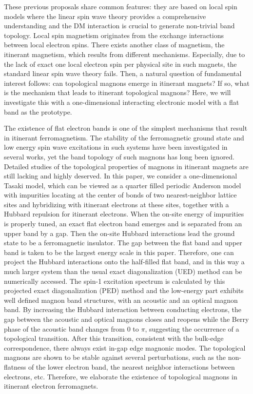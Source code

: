 \documentclass[amsmath,superscriptaddress,showpacs,aps,prb,twocolumn]{revtex4-1}
\begin{document}
\par These previous proposals share common features: they are based on local spin models where the linear spin wave theory provides a comprehensive understanding and the DM interaction is crucial to generate non-trivial band topology. Local spin magnetism originates from the exchange interactions between local electron spins. There exists another class of magnetism, the itinerant magnetism, which results from different mechanisms. Especially, due to the lack of exact one local electron spin per physical site in such magnets, the standard linear spin wave theory fails. Then, a natural question of fundamental interest follows: can topological magnons emerge in itinerant magnets? If so, what is the mechanism that leads to itinerant topological magnons? Here, we will investigate this with a one-dimensional interacting electronic model with a flat band as the prototype.

\par The existence of flat electron bands is one of the simplest mechanisms that result in itinerant ferromagnetism\cite{T_PRL1992,M_PLA1993,MT_CMP1993}. The stability of the ferromagnetic ground state and low energy spin wave excitations in such systems have been investigated in several works\cite{T_PRL1994,KA_PRL1994,DG_PRB2015}, yet the band topology of such magnons has long been ignored. Detailed studies of the topological properties of magnons in itinerant magnets are still lacking and highly deserved. In this paper, we consider a one-dimensional Tasaki model\cite{T_PRL1992,T_PTP1998}, which can be viewed as a quarter filled periodic Anderson model with impurities locating at the center of bonds of two nearest-neighbor lattice sites and hybridizing with itinerant electrons at these sites, together with a Hubbard repulsion for itinerant electrons. When the on-site energy of impurities is properly tuned, an exact flat electron band emerges and is separated from an upper band by a gap. Then the on-site Hubbard interactions lead the ground state to be a ferromagnetic insulator. The gap between the flat band and upper band is taken to be the largest energy scale in this paper. Therefore, one can project the Hubbard interactions onto the half-filled flat band\cite{KA_PRL1994,T_PTP1998}, and in this way a much larger system than the usual exact diagonalization (UED) method can be numerically accessed. The spin-1 excitation spectrum is calculated by this projected exact diagonalization (PED) method and the low-energy part exhibits well defined magnon band structures, with an acoustic and an optical magnon band. By increasing the Hubbard interaction between conducting electrons, the gap between the acoustic and optical magnons closes and reopens while the Berry phase of the acoustic band changes from 0 to $\pi$, suggesting the occurrence of a topological transition. After this transition, consistent with the bulk-edge correspondence, there always exist in-gap edge magnonic modes. The topological magnons are shown to be stable against several perturbations, such as the non-flatness of the lower electron band, the nearest neighbor interactions between electrons, etc. Therefore, we elaborate the existence of topological magnons in itinerant electron ferromagnets.
\end{document}
